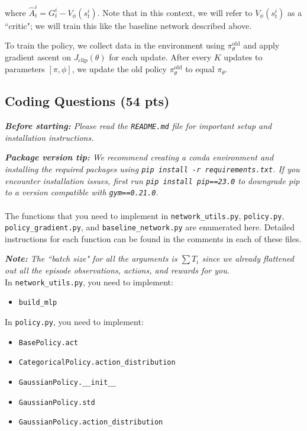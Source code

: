 \documentclass{article}
\begin{document}
where $\hat{A}^i_t = G^i_t - V_{\phi}(s^i_t)$. Note that in this context, we will refer to $V_{\phi}(s^i_t)$ as a ``critic"; we will train this like the baseline network described above. 


To train the policy, we collect data in the environment using $\pi_\theta^\mathrm{old}$ and apply gradient ascent on $J_\mathrm{clip}(\theta)$ for each update. After every $K$ updates to parameters $[\pi, \phi]$, we update the old policy $\pi_\theta^\mathrm{old}$ to equal $\pi_\theta$. 

\subsection{Coding Questions (54 pts)}
\emph{\textbf{Before starting:} Please read the \texttt{README.md} file for important setup and installation instructions.}

\emph{\textbf{Package version tip:} We recommend creating a conda environment and installing the required packages using \texttt{pip install -r requirements.txt}. If you encounter installation issues, first run \texttt{pip install pip==23.0} to downgrade pip to a version compatible with \texttt{gym==0.21.0}.}
\\\\
The functions that you need to implement in \texttt{network\_utils.py}, \texttt{policy.py}, \texttt{policy\_gradient.py}, and \texttt{baseline\_network.py} are enumerated here. Detailed instructions for each function can be found in the comments in each of these files.

\emph{\textbf{Note:} The ``batch size" for all the arguments is $\sum T_i$ since we already flattened out all the episode observations, actions, and rewards for you.}
\\
In \texttt{network\_utils.py}, you need to implement:
\begin{itemize}
\item \texttt{build\_mlp}
\end{itemize}

In \texttt{policy.py}, you need to implement:
\begin{itemize}
\item \texttt{BasePolicy.act}
\item \texttt{CategoricalPolicy.action\_distribution}
\item \texttt{GaussianPolicy.\_\_init\_\_}
\item \texttt{GaussianPolicy.std}
\item \texttt{GaussianPolicy.action\_distribution}
\end{itemize}
\end{document}
